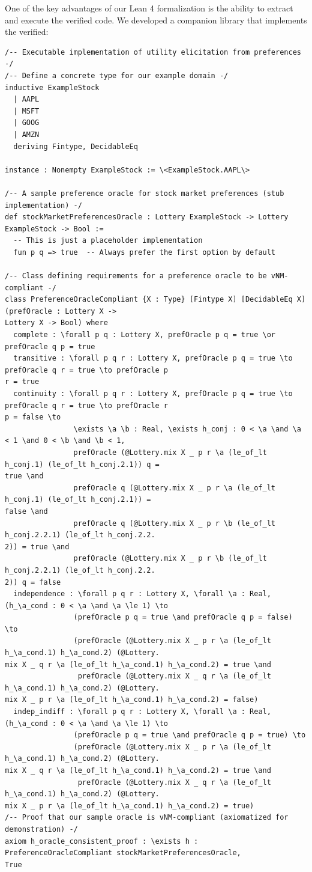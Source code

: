 \documentclass{article}
\theoremstyle{definition}
\begin{document}
One of the key advantages of our Lean 4 formalization is the ability to extract and execute the verified code. We developed a companion library that implements the verified:

\begin{lstlisting}[caption={Computational Evidence: Extracting and Running the Verified Code: Lean 4 Implementation}]
/-- Executable implementation of utility elicitation from preferences -/
/-- Define a concrete type for our example domain -/
inductive ExampleStock
  | AAPL
  | MSFT
  | GOOG
  | AMZN
  deriving Fintype, DecidableEq

instance : Nonempty ExampleStock := \<ExampleStock.AAPL\>

/-- A sample preference oracle for stock market preferences (stub implementation) -/
def stockMarketPreferencesOracle : Lottery ExampleStock -> Lottery ExampleStock -> Bool :=
  -- This is just a placeholder implementation
  fun p q => true  -- Always prefer the first option by default

/-- Class defining requirements for a preference oracle to be vNM-compliant -/
class PreferenceOracleCompliant {X : Type} [Fintype X] [DecidableEq X] (prefOracle : Lottery X ->
Lottery X -> Bool) where
  complete : \forall p q : Lottery X, prefOracle p q = true \or prefOracle q p = true
  transitive : \forall p q r : Lottery X, prefOracle p q = true \to prefOracle q r = true \to prefOracle p
r = true
  continuity : \forall p q r : Lottery X, prefOracle p q = true \to prefOracle q r = true \to prefOracle r
p = false \to
                \exists \a \b : Real, \exists h_conj : 0 < \a \and \a < 1 \and 0 < \b \and \b < 1,
                prefOracle (@Lottery.mix X _ p r \a (le_of_lt h_conj.1) (le_of_lt h_conj.2.1)) q =
true \and
                prefOracle q (@Lottery.mix X _ p r \a (le_of_lt h_conj.1) (le_of_lt h_conj.2.1)) =
false \and
                prefOracle q (@Lottery.mix X _ p r \b (le_of_lt h_conj.2.2.1) (le_of_lt h_conj.2.2.
2)) = true \and
                prefOracle (@Lottery.mix X _ p r \b (le_of_lt h_conj.2.2.1) (le_of_lt h_conj.2.2.
2)) q = false
  independence : \forall p q r : Lottery X, \forall \a : Real, (h_\a_cond : 0 < \a \and \a \le 1) \to
                (prefOracle p q = true \and prefOracle q p = false) \to
                (prefOracle (@Lottery.mix X _ p r \a (le_of_lt h_\a_cond.1) h_\a_cond.2) (@Lottery.
mix X _ q r \a (le_of_lt h_\a_cond.1) h_\a_cond.2) = true \and
                 prefOracle (@Lottery.mix X _ q r \a (le_of_lt h_\a_cond.1) h_\a_cond.2) (@Lottery.
mix X _ p r \a (le_of_lt h_\a_cond.1) h_\a_cond.2) = false)
  indep_indiff : \forall p q r : Lottery X, \forall \a : Real, (h_\a_cond : 0 < \a \and \a \le 1) \to
                (prefOracle p q = true \and prefOracle q p = true) \to
                (prefOracle (@Lottery.mix X _ p r \a (le_of_lt h_\a_cond.1) h_\a_cond.2) (@Lottery.
mix X _ q r \a (le_of_lt h_\a_cond.1) h_\a_cond.2) = true \and
                 prefOracle (@Lottery.mix X _ q r \a (le_of_lt h_\a_cond.1) h_\a_cond.2) (@Lottery.
mix X _ p r \a (le_of_lt h_\a_cond.1) h_\a_cond.2) = true)
/-- Proof that our sample oracle is vNM-compliant (axiomatized for demonstration) -/
axiom h_oracle_consistent_proof : \exists h : PreferenceOracleCompliant stockMarketPreferencesOracle,
True


\end{lstlisting}
\end{document}
